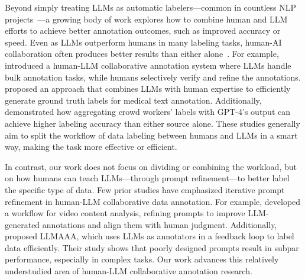 Beyond simply treating LLMs as automatic labelers---common in countless NLP projects~\cite{tan2024large}---a growing body of work explores how to combine human and LLM efforts to achieve better annotation outcomes, such as improved accuracy or speed.
Even as LLMs outperform humans in many labeling tasks, human-AI collaboration often produces better results than either alone~\cite{vaccaro2024combinations}.
For example, \citet{kim2024meganno+} introduced a human-LLM collaborative annotation system where LLMs handle bulk annotation tasks, while humans selectively verify and refine the annotations. 
\citet{goel2023llms} proposed an approach that combines LLMs with human expertise to efficiently generate ground truth labels for medical text annotation.
Additionally, \citet{10.1145/3613904.3642834} demonstrated how aggregating crowd workers' labels with GPT-4's output can achieve higher labeling accuracy than either source alone.
These studies generally aim to split the workflow of data labeling between humans and LLMs in a smart way, making the task more effective or efficient. 

In contrast, our work does not focus on dividing or combining the workload, but on how humans can teach LLMs---through prompt refinement---to better label the specific type of data.
Few prior studies have emphasized iterative prompt refinement in human-LLM collaborative data annotation.
For example, \citet{liu2024harnessing} developed a workflow for video content analysis, refining prompts to improve LLM-generated annotations and align them with human judgment.
Additionally, \citet{zhang2023llmaaa} proposed LLMAAA, which uses LLMs as annotators in a feedback loop to label data efficiently.
Their study shows that poorly designed prompts result in subpar performance, especially in complex tasks. %
Our work advances this relatively understudied area of human-LLM collaborative annotation research.


